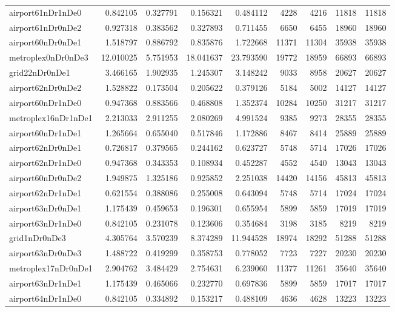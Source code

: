\begin{longtable}{|l|r|r|r|r|r|r|r|r|}
airport61nDr1nDe0 & 0.842105 & 0.327791 & 0.156321 & 0.484112 & 4228 & 4216 & 11818 & 11818 \\
airport61nDr0nDe2 & 0.927318 & 0.383562 & 0.327893 & 0.711455 & 6650 & 6455 & 18960 & 18960 \\
airport60nDr0nDe1 & 1.518797 & 0.886792 & 0.835876 & 1.722668 & 11371 & 11304 & 35938 & 35938 \\
metroplex0nDr0nDe3 & 12.010025 & 5.751953 & 18.041637 & 23.793590 & 19772 & 18959 & 66893 & 66893 \\
grid22nDr0nDe1 & 3.466165 & 1.902935 & 1.245307 & 3.148242 & 9033 & 8958 & 20627 & 20627 \\
airport62nDr0nDe2 & 1.528822 & 0.173504 & 0.205622 & 0.379126 & 5184 & 5002 & 14127 & 14127 \\
airport60nDr1nDe0 & 0.947368 & 0.883566 & 0.468808 & 1.352374 & 10284 & 10250 & 31217 & 31217 \\
metroplex16nDr1nDe1 & 2.213033 & 2.911255 & 2.080269 & 4.991524 & 9385 & 9273 & 28355 & 28355 \\
airport60nDr1nDe1 & 1.265664 & 0.655040 & 0.517846 & 1.172886 & 8467 & 8414 & 25889 & 25889 \\
airport62nDr0nDe1 & 0.726817 & 0.379565 & 0.244162 & 0.623727 & 5748 & 5714 & 17026 & 17026 \\
airport62nDr1nDe0 & 0.947368 & 0.343353 & 0.108934 & 0.452287 & 4552 & 4540 & 13043 & 13043 \\
airport60nDr0nDe2 & 1.949875 & 1.325186 & 0.925852 & 2.251038 & 14420 & 14156 & 45813 & 45813 \\
airport62nDr1nDe1 & 0.621554 & 0.388086 & 0.255008 & 0.643094 & 5748 & 5714 & 17024 & 17024 \\
airport63nDr0nDe1 & 1.175439 & 0.459653 & 0.196301 & 0.655954 & 5899 & 5859 & 17019 & 17019 \\
airport63nDr1nDe0 & 0.842105 & 0.231078 & 0.123606 & 0.354684 & 3198 & 3185 & 8219 & 8219 \\
grid1nDr0nDe3 & 4.305764 & 3.570239 & 8.374289 & 11.944528 & 18974 & 18292 & 51288 & 51288 \\
airport63nDr0nDe3 & 1.488722 & 0.419299 & 0.358753 & 0.778052 & 7723 & 7227 & 20230 & 20230 \\
metroplex17nDr0nDe1 & 2.904762 & 3.484429 & 2.754631 & 6.239060 & 11377 & 11261 & 35640 & 35640 \\
airport63nDr1nDe1 & 1.175439 & 0.465066 & 0.232770 & 0.697836 & 5899 & 5859 & 17017 & 17017 \\
airport64nDr1nDe0 & 0.842105 & 0.334892 & 0.153217 & 0.488109 & 4636 & 4628 & 13223 & 13223 \\

\end{longtable}
